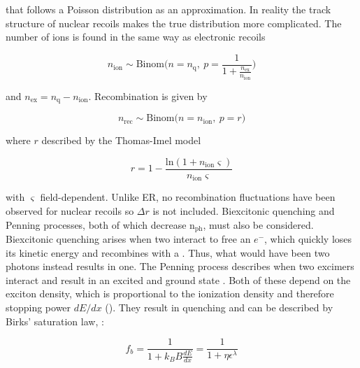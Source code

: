 \noindent that follows a Poisson distribution as an approximation.  In reality the track structure of nuclear recoils makes the true
distribution more complicated.  The number of ions is found in the same way as electronic recoils

\begin{equation}
n_{\mathrm{ion}} \sim \mathrm{Binom} \Bigg(n = n_{\mathrm{q}},\ p = \frac{1}{1 + \frac{n_{\mathrm{ex}}}{n_{\mathrm{ion}}}} \Bigg)
\end{equation}

\noindent and $n_{\mathrm{ex}} = n_{\mathrm{q}} - n_{\mathrm{ion}}$.  Recombination is given by

\vspace{-10pt}

\begin{equation}
n_{\mathrm{rec}} \sim \mathrm{Binom} \big(n = n_{\mathrm{ion}},\ p = r \big)
\end{equation}

\noindent where $r$ described by the Thomas-Imel model

\begin{equation}
r = 1 - \frac{\mathrm{ln} (1 + n_{\mathrm{ion}} \varsigma)}{n_{\mathrm{ion}} \varsigma}
\end{equation}

\noindent with $\varsigma$ field-dependent.  Unlike ER, no recombination fluctuations have been observed for nuclear recoils so
$\Delta r$ is not included.  Biexcitonic quenching and Penning processes, both of which decrease
$\mathrm{n_{ph}}$, must also be considered.  Biexcitonic quenching arises when two
 interact to free an $e^-$, which quickly loses its kinetic energy
and recombines with a .  Thus, what would have been two photons instead results in one.  The Penning process describes when
two excimers interact and result in an excited and ground state .  Both of these depend on the exciton density, which
is proportional to the ionization density and therefore stopping power $dE / dx$ ().  They result in quenching
and can be
described by Birks' saturation law,  :

\vspace{-10pt}

\begin{equation}
f_b = \frac{1}{1 + k_{B}B \frac{dE}{dx}} = \frac{1}{1 + \eta \epsilon^{\lambda}}
\label{eq:er_nr_calibrations_parameter_determ_nr_birks}
\end{equation}

